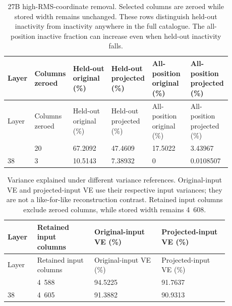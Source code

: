 \begin{longtable}{@{}L{0.07\linewidth}L{0.13\linewidth}L{0.17\linewidth}L{0.17\linewidth}L{0.17\linewidth}L{0.17\linewidth}@{}}
\caption{27B high-RMS-coordinate removal. Selected columns are zeroed while stored width remains unchanged. These rows distinguish held-out inactivity from inactivity anywhere in the full catalogue. The all-position inactive fraction can increase even when held-out inactivity falls.}\\
\toprule
Layer & Columns zeroed & Held-out original (\%) & Held-out projected (\%) & All-position original (\%) & All-position projected (\%) \\
\midrule
\endfirsthead
\toprule
Layer & Columns zeroed & Held-out original (\%) & Held-out projected (\%) & All-position original (\%) & All-position projected (\%) \\
\midrule
\endhead
\endfoot
\bottomrule
{} & 20 & 67.2092 & 47.4609 & 17.5022 & 3.43967 \\
38 & 3 & 10.5143 & 7.38932 & 0 & 0.0108507 \\
\end{longtable}
\begin{longtable}{@{}L{0.1\linewidth}L{0.23\linewidth}L{0.27\linewidth}L{0.27\linewidth}@{}}
\caption{Variance explained under different variance references. Original-input VE and projected-input VE use their respective input variances; they are not a like-for-like reconstruction contrast. Retained input columns exclude zeroed columns, while stored width remains 4~608.}\\
\toprule
Layer & Retained input columns & Original-input VE (\%) & Projected-input VE (\%) \\
\midrule
\endfirsthead
\toprule
Layer & Retained input columns & Original-input VE (\%) & Projected-input VE (\%) \\
\midrule
\endhead
\endfoot
\bottomrule
{} & 4~588 & 94.5225 & 91.7637 \\
38 & 4~605 & 91.3882 & 90.9313 \\
\end{longtable}
